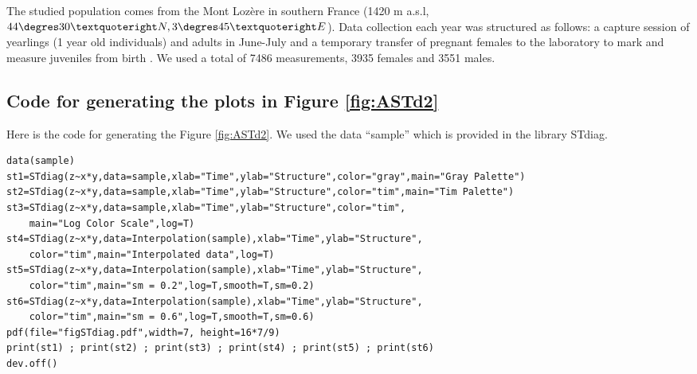 The studied population comes from the Mont Lozère in southern France (1420 m
a.s.l, $44\degres 30’N, 3 \degres 45’E$). Data collection each year was
structured as follows:
a capture session of yearlings (1 year old individuals) and adults in June-July
and a temporary transfer of pregnant females to the laboratory to mark and
measure juveniles from birth \autocites{le-galliard2010a}.
We used a total of 7486 measurements, 3935 females and 3551 males.

\subsection{Code for generating the plots in Figure \ref{fig:ASTd2}}

Here is the code for generating the Figure \ref{fig:ASTd2}. We used the data
“sample” which is provided in the library STdiag.
\begin{verbatim}
data(sample)
st1=STdiag(z~x*y,data=sample,xlab="Time",ylab="Structure",color="gray",main="Gray Palette")
st2=STdiag(z~x*y,data=sample,xlab="Time",ylab="Structure",color="tim",main="Tim Palette")
st3=STdiag(z~x*y,data=sample,xlab="Time",ylab="Structure",color="tim",
    main="Log Color Scale",log=T)
st4=STdiag(z~x*y,data=Interpolation(sample),xlab="Time",ylab="Structure",
    color="tim",main="Interpolated data",log=T)
st5=STdiag(z~x*y,data=Interpolation(sample),xlab="Time",ylab="Structure",
    color="tim",main="sm = 0.2",log=T,smooth=T,sm=0.2)
st6=STdiag(z~x*y,data=Interpolation(sample),xlab="Time",ylab="Structure",
    color="tim",main="sm = 0.6",log=T,smooth=T,sm=0.6)
pdf(file="figSTdiag.pdf",width=7, height=16*7/9)
print(st1) ; print(st2) ; print(st3) ; print(st4) ; print(st5) ; print(st6)
dev.off()
\end{verbatim}